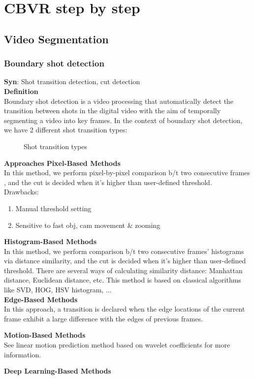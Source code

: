 \section{CBVR step by step}
\subsection{Video Segmentation}
\subsubsection{Boundary shot detection}
\textbf{Syn}: Shot transition detection, cut detection\\

\noindent\textbf{Definition}\\
\indent Boundary shot detection is a video processing that automatically detect the transition between shots in the digital video with the aim of temporally segmenting a video into key frames. In the context of boundary shot detection, we have 2 different shot transition types:
\begin{figure}[h!]
	\centering
	\caption{Shot transition types}
\end{figure}

\noindent\textbf{Approaches}
\noindent\textbf{Pixel-Based Methods}\\
In this method, we perform pixel-by-pixel comparison b/t two consecutive frames , and the cut is decided when it's higher than user-defined threshold.\\

\noindent Drawbacks:\vspace{-2.5mm}
\begin{enumerate}
	\item Manual threshold setting
	\item Sensitive to fast obj, cam movement \& zooming
\end{enumerate}


\noindent\textbf{Histogram-Based Methods}\\
In this method, we perform comparison b/t two consecutive frames' histograms via distance similarity, and the cut is decided when it's higher than user-defined threshold. There are several ways of calculating similarity distance: Manhattan distance, Euclidean distance, etc. This method is based on classical algorithms like SVD, HOG, HSV histogram, ...\\


\noindent\textbf{Edge-Based Methods}\\
In this approach, a transition is declared when the edge locations of the current frame exhibit a large difference with the edges of previous frames.


\noindent\textbf{Motion-Based Methods}\\
See linear motion prediction method based on wavelet coefficients for more information.

\noindent\textbf{Deep Learning-Based Methods}\\
